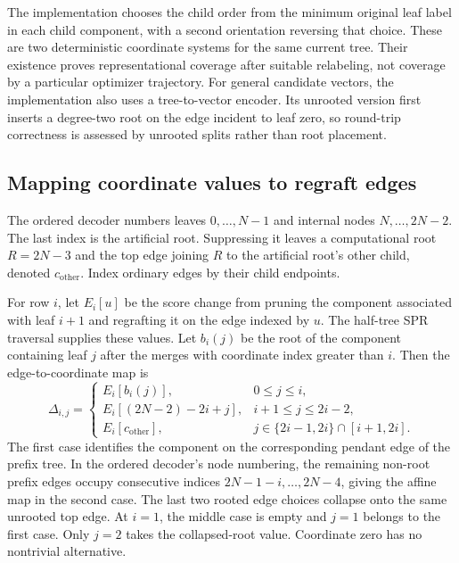 The implementation chooses the child order from the minimum original leaf label in each child component, with a second orientation reversing that choice.
These are two deterministic coordinate systems for the same current tree.
Their existence proves representational coverage after suitable relabeling, not coverage by a particular optimizer trajectory.
For general candidate vectors, the implementation also uses a tree-to-vector encoder.
Its unrooted version first inserts a degree-two root on the edge incident to leaf zero, so round-trip correctness is assessed by unrooted splits rather than root placement.

\subsection{Mapping coordinate values to regraft edges}
\label{sec:mapping}

The ordered decoder numbers leaves $0,\ldots,N-1$ and internal nodes $N,\ldots,2N-2$.
The last index is the artificial root.
Suppressing it leaves a computational root $R=2N-3$ and the top edge joining $R$ to the artificial root's other child, denoted $c_{\mathrm{other}}$.
Index ordinary edges by their child endpoints.

For row $i$, let $E_i[u]$ be the score change from pruning the component associated with leaf $i+1$ and regrafting it on the edge indexed by $u$.
The half-tree SPR traversal supplies these values.
Let $b_i(j)$ be the root of the component containing leaf $j$ after the merges with coordinate index greater than $i$.
Then the edge-to-coordinate map is
\begin{equation}
 \Delta_{i,j}=
 \begin{cases}
 E_i[b_i(j)], &0\leq j\leq i,\\[2pt]
 E_i[(2N-2)-2i+j], &i+1\leq j\leq2i-2,\\[2pt]
 E_i[c_{\mathrm{other}}], &j\in\{2i-1,2i\}\cap[i+1,2i].
 \end{cases}
 \label{eq:full_mapping}
\end{equation}
The first case identifies the component on the corresponding pendant edge of the prefix tree.
In the ordered decoder's node numbering, the remaining non-root prefix edges occupy consecutive indices $2N-1-i,\ldots,2N-4$, giving the affine map in the second case.
The last two rooted edge choices collapse onto the same unrooted top edge.
At $i=1$, the middle case is empty and $j=1$ belongs to the first case.
Only $j=2$ takes the collapsed-root value.
Coordinate zero has no nontrivial alternative.

